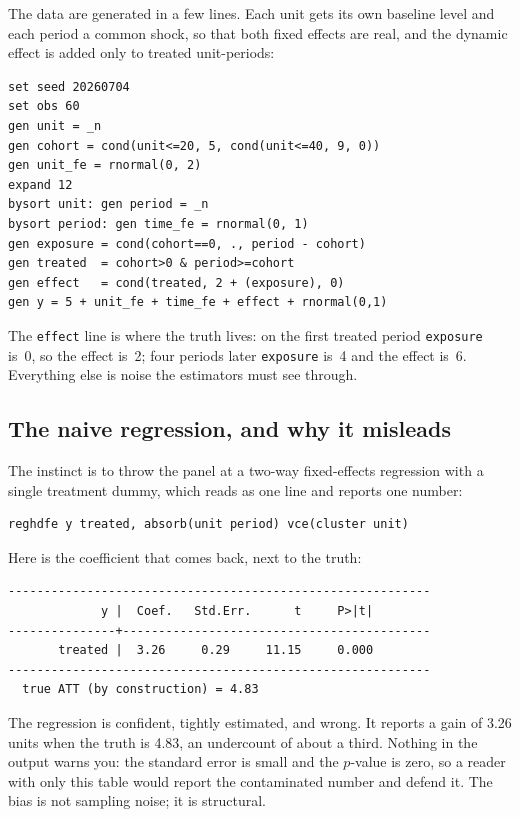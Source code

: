 \documentclass[
    a4paper,
    fontsize=10pt,
    twoside=true,
    numbers=noenddot,
]{kaobook}
\begin{document}
The data are generated in a few lines. Each unit gets its own baseline level and each period a common shock, so that both fixed effects are real, and the dynamic effect is added only to treated unit-periods:
{\footnotesize
\begin{verbatim}
set seed 20260704
set obs 60
gen unit = _n
gen cohort = cond(unit<=20, 5, cond(unit<=40, 9, 0))
gen unit_fe = rnormal(0, 2)
expand 12
bysort unit: gen period = _n
bysort period: gen time_fe = rnormal(0, 1)
gen exposure = cond(cohort==0, ., period - cohort)
gen treated  = cohort>0 & period>=cohort
gen effect   = cond(treated, 2 + (exposure), 0)
gen y = 5 + unit_fe + time_fe + effect + rnormal(0,1)
\end{verbatim}
}
The \texttt{effect} line is where the truth lives: on the first treated period \texttt{exposure} is~0, so the effect is~2; four periods later \texttt{exposure} is~4 and the effect is~6. Everything else is noise the estimators must see through.

\subsection{The naive regression, and why it misleads}
The instinct is to throw the panel at a two-way fixed-effects regression with a single treatment dummy, which reads as one line and reports one number:
{\footnotesize
\begin{verbatim}
reghdfe y treated, absorb(unit period) vce(cluster unit)
\end{verbatim}
}
Here is the coefficient that comes back, next to the truth:
{\footnotesize
\begin{verbatim}
-----------------------------------------------------------
             y |  Coef.   Std.Err.      t     P>|t|
---------------+-------------------------------------------
       treated |  3.26     0.29     11.15     0.000
-----------------------------------------------------------
  true ATT (by construction) = 4.83
\end{verbatim}
}
The regression is confident, tightly estimated, and wrong. It reports a gain of 3.26 units when the truth is 4.83, an undercount of about a third. Nothing in the output warns you: the standard error is small and the $p$-value is zero, so a reader with only this table would report the contaminated number and defend it. The bias is not sampling noise; it is structural.
\end{document}
